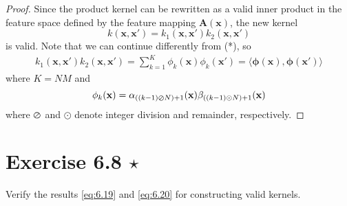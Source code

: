 \begin{proof}
    Since the product kernel can be rewritten as a valid inner product in the 
    feature space defined by the feature mapping $\mathbf{A}(\mathbf{x})$,
    the new kernel
    \begin{equation}\label{eq:6.18}\tag{6.18}
        k(\mathbf{x}, \mathbf{x}')
        = k_1(\mathbf{x}, \mathbf{x}') k_2(\mathbf{x}, \mathbf{x}')
    \end{equation}
    is valid. Note that we can continue differently from (*), so
    \begin{align*}
        k_1(\mathbf{x}, \mathbf{x}') k_2(\mathbf{x}, \mathbf{x}')
        = \sum_{k=1}^{K} \phi_k (\mathbf{x}) \phi_k(\mathbf{x}')
        = \langle \bm{\phi}(\mathbf{x}), \bm{\phi}(\mathbf{x}') \rangle
    \end{align*}
    where $K = NM$ and
    \[
        \phi_k(\mathbf{x}) 
        = \alpha_{((k - 1) \varoslash N) + 1}(\mathbf{x})
        \beta_{((k - 1) \odot N) + 1}(\mathbf{x})
    \] 
    where $\varoslash$ and $\odot$ denote integer division and remainder,
    respectively.
\end{proof}

\section*{Exercise 6.8 $\star$}
Verify the results \eqref{eq:6.19} and \eqref{eq:6.20} for constructing valid kernels.

\vspace{1em}

